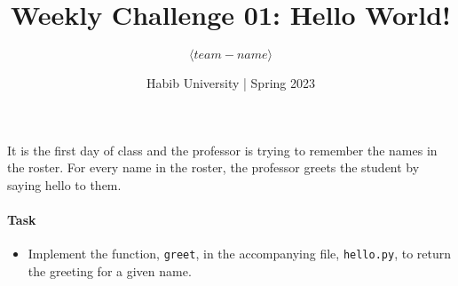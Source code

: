 \documentclass[a4paper]{exam}
\title{Weekly Challenge 01: Hello World!}
\author{$\langle team-name \rangle$}  %
\date{Habib University | Spring 2023}
\begin{document}
\maketitle

\begin{questions}
  
  It is the first day of class and the professor is trying to remember the names in the roster. For every name in the roster, the professor greets the student by saying hello to them.

  \paragraph{Task}
  \begin{itemize}
  \item Implement the function, \texttt{greet}, in the accompanying file, \texttt{hello.py}, to return the greeting for a given name.
  \end{itemize}
\end{questions}
\end{document}
